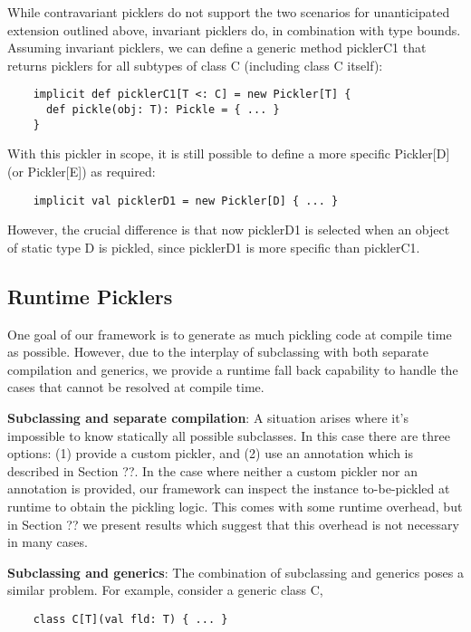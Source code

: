 \documentclass[preprint,10pt]{sigplanconf}
\theoremstyle{definition}
\begin{document}
While contravariant picklers do not support the two scenarios for unanticipated extension outlined above, invariant picklers do, in combination with type bounds. Assuming invariant picklers, we can define a generic method picklerC1 that returns picklers for all subtypes of class C (including class C itself):

\begin{verbatim}
    implicit def picklerC1[T <: C] = new Pickler[T] {
      def pickle(obj: T): Pickle = { ... }
    }
\end{verbatim}

With this pickler in scope, it is still possible to define a more specific Pickler[D] (or Pickler[E]) as required:

\begin{verbatim}
    implicit val picklerD1 = new Pickler[D] { ... }
\end{verbatim}

However, the crucial difference is that now picklerD1 is selected when an object of static type D is pickled, since picklerD1 is more specific than picklerC1.

\subsection{Runtime Picklers}

One goal of our framework is to generate as much pickling code at compile time as possible. However, due to the interplay of subclassing with both separate compilation and generics, we provide a runtime fall back capability to handle the cases that cannot be resolved at compile time.

{\bf Subclassing and separate compilation}: A situation arises where it's impossible to know statically all possible subclasses. In this case there are three options: (1) provide a custom pickler, and (2) use an annotation which is described in Section ??. In the case where neither a custom pickler nor an annotation is provided, our framework can inspect the instance to-be-pickled at runtime to obtain the pickling logic. This comes with some runtime overhead, but in Section ?? we present results which suggest that this overhead is not necessary in many cases.

{\bf Subclassing and generics}: The combination of subclassing and generics poses a similar problem. For example, consider a generic class C,

\begin{verbatim}
    class C[T](val fld: T) { ... }
\end{verbatim}
\end{document}
